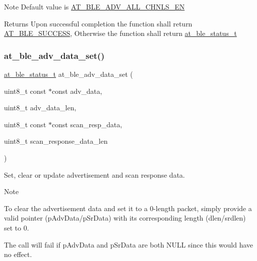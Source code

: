\begin{DoxyNote}{Note}
Default value is \mbox{\hyperlink{at__ble__api_8h_ae3d53ccdbeba291d4765432f6a9d33caac5dcc09e205dc25c30598616835fb3cf}{A\+T\+\_\+\+B\+L\+E\+\_\+\+A\+D\+V\+\_\+\+A\+L\+L\+\_\+\+C\+H\+N\+L\+S\+\_\+\+EN}}
\end{DoxyNote}
\begin{DoxyReturn}{Returns}
Upon successful completion the function shall return \mbox{\hyperlink{group__error__codes__group_gga3b1db9b95feb157b3c188ca27fe76988a7e3bfff5387331cd4f2c56cbcbbd7e19}{A\+T\+\_\+\+B\+L\+E\+\_\+\+S\+U\+C\+C\+E\+SS}}, Otherwise the function shall return \mbox{\hyperlink{at__ble__api_8h_ace24eb4e5ca3f325c663b809da5feb92}{at\+\_\+ble\+\_\+status\+\_\+t}} 
\end{DoxyReturn}
\mbox{\label{group__gap__adv__group_gaf4472b661944026a537f3fe2f65b8fcc}} 
\subsubsection{\texorpdfstring{at\_ble\_adv\_data\_set()}{at\_ble\_adv\_data\_set()}}
{\footnotesize\ttfamily \mbox{\hyperlink{group__error__codes__group_ga3b1db9b95feb157b3c188ca27fe76988}{at\+\_\+ble\+\_\+status\+\_\+t}} at\+\_\+ble\+\_\+adv\+\_\+data\+\_\+set (\begin{DoxyParamCaption}\item[{uint8\+\_\+t const $\ast$const}]{adv\+\_\+data,  }\item[{uint8\+\_\+t}]{adv\+\_\+data\+\_\+len,  }\item[{uint8\+\_\+t const $\ast$const}]{scan\+\_\+resp\+\_\+data,  }\item[{uint8\+\_\+t}]{scan\+\_\+response\+\_\+data\+\_\+len }\end{DoxyParamCaption})}



Set, clear or update advertisement and scan response data. 

\begin{DoxyNote}{Note}

\begin{DoxyItemize}
\item To clear the advertisement data and set it to a 0-\/length packet, simply provide a valid pointer (p\+Adv\+Data/p\+Sr\+Data) with its corresponding length (dlen/srdlen) set to 0.
\item The call will fail if p\+Adv\+Data and p\+Sr\+Data are both N\+U\+LL since this would have no effect.
\end{DoxyItemize}
\end{DoxyNote}


